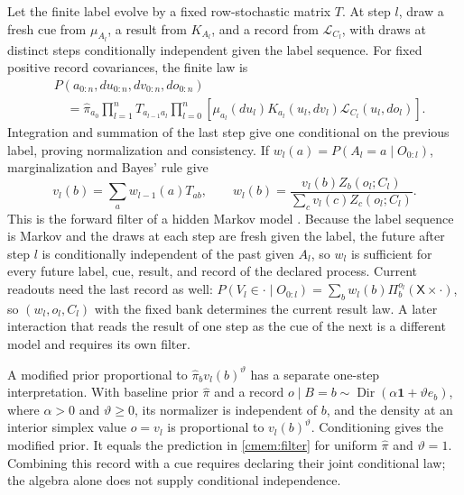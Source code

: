 Let the finite label evolve by a fixed row-stochastic matrix $T$. At step $l$, draw a fresh cue from $\mu_{A_l}$, a result from $K_{A_l}$, and a record from $\mathcal L_{C_l}$, with draws at distinct steps conditionally independent given the label sequence. For fixed positive record covariances, the finite law is
\begin{equation}
 \begin{split}
 &P(a_{0:n},du_{0:n},dv_{0:n},do_{0:n})\\
 &\quad=\hat\pi_{a_0}\prod_{l=1}^nT_{a_{l-1}a_l}
 \prod_{l=0}^n\left[\mu_{a_l}(du_l)K_{a_l}(u_l,dv_l)
 \mathcal L_{C_l}(u_l,do_l)\right].
 \end{split}
 \label{cmem:history}
\end{equation}
Integration and summation of the last step give one conditional on the previous label, proving normalization and consistency. If $w_l(a)=P(A_l=a\mid O_{0:l})$, marginalization and Bayes' rule give
\begin{equation}
 v_l(b)=\sum_aw_{l-1}(a)T_{ab},\qquad
 w_l(b)=\frac{v_l(b)Z_b(o_l;C_l)}{\sum_c v_l(c)Z_c(o_l;C_l)}.
 \label{cmem:filter}
\end{equation}
This is the forward filter of a hidden Markov model \citep{BaumPetrie1966}. Because the label sequence is Markov and the draws at each step are fresh given the label, the future after step $l$ is conditionally independent of the past given $A_l$, so $w_l$ is sufficient for every future label, cue, result, and record of the declared process. Current readouts need the last record as well: $P(V_l\in\cdot\mid O_{0:l})=\sum_bw_l(b)\Pi_b^{o_l}(\mathsf X\times\cdot)$, so $(w_l,o_l,C_l)$ with the fixed bank determines the current result law. A later interaction that reads the result of one step as the cue of the next is a different model and requires its own filter.

A modified prior proportional to $\hat\pi_bv_l(b)^\vartheta$ has a separate one-step interpretation. With baseline prior $\hat\pi$ and a record $o\mid B=b\sim\operatorname{Dir}(\alpha\mathbf1+\vartheta e_b)$, where $\alpha>0$ and $\vartheta\ge0$, its normalizer is independent of $b$, and the density at an interior simplex value $o=v_l$ is proportional to $v_l(b)^\vartheta$. Conditioning gives the modified prior. It equals the prediction in \cref{cmem:filter} for uniform $\hat\pi$ and $\vartheta=1$. Combining this record with a cue requires declaring their joint conditional law; the algebra alone does not supply conditional independence.

